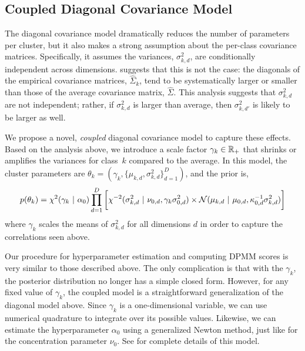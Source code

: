 
\subsection{Coupled Diagonal Covariance Model}

The diagonal covariance model dramatically reduces the number of parameters per cluster, but it also makes a strong assumption about the per-class covariance matrices.
Specifically, it assumes the variances, $\sigma_{k,d}^2$, are conditionally independent across dimensions.
 suggests that this is not the case: the diagonals of the empirical covariance matrices, $\hat{\Sigma}_k$, tend to be systematically larger
or smaller than those of the average covariance matrix, $\hat{\Sigma}$.
This analysis suggests that $\sigma_{k,d}^2$ are not independent; rather, if $\sigma_{k,d}^2$ is larger than average, then $\sigma_{k,d'}^2$ is likely to be larger as well.

We propose a novel, \emph{coupled} diagonal covariance model to capture these effects. Based on the analysis above, we introduce a scale factor $\gamma_k \in \mathbb{R}_+$ that shrinks or amplifies the variances for class~$k$ compared to the average.
In this model, the cluster parameters are $\theta_k = (\gamma_k, \{\mu_{k,d}, \sigma_{k,d}^2\}_{d=1}^D)$, and the prior is,
\begin{equation}
    p(\theta_k) =
    \chi^2(\gamma_k ~\vert~ \alpha_0)
    \prod_{d=1}^D \bigg[\chi^{-2}(\sigma_{k,d}^2 ~\vert~ \nu_{0,d}, \gamma_k \sigma_{0,d}^2)
    \times \mathcal{N}(\mu_{k,d} ~\vert~ \mu_{0,d}, \kappa_{0,d}^{-1} \sigma_{k,d}^2) \bigg]
\end{equation}
where $\gamma_k$ scales the means of $\sigma_{k,d}^2$ for all dimensions $d$ in order to capture the correlations seen above.



Our procedure for hyperparameter estimation and computing DPMM scores is very similar to those described above.
The only complication is that with the $\gamma_k$, the posterior distribution no longer has a simple closed form.
However, for any fixed value of $\gamma_k$, the coupled model is a straightforward generalization of the diagonal model above.
Since $\gamma_k$ is a one-dimensional variable, we can use numerical quadrature to integrate over its possible values.
Likewise, we can estimate the hyperparameter $\alpha_0$ using a generalized Newton method, just like for the concentration parameter $\nu_0$.
See  for complete details of this model.
